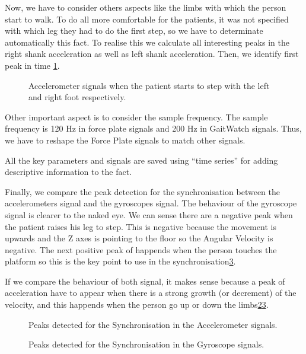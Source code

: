 Now, we have to consider others aspects like the limbs with which the person start to walk. To do all more comfortable for the patients, it was not specified with which leg they had to do the first step, so we have to determinate automatically this fact. To realise this we calculate all interesting peaks in the right shank acceleration as well as left shank acceleration. Then, we identify first peak in time \ref{fig:startLeftRight}.

\begin{figure}[H]
	\centering
	\caption{Accelerometer signals when the patient starts to step with the left and right foot respectively.}
	\label{fig:startLeftRight}
\end{figure} 

Other important aspect is to consider the sample frequency. The sample frequency is 120 Hz in force plate signals and 200 Hz in GaitWatch signals. Thus, we have to reshape the Force Plate signals to match other signals.

All the key parameters and signals are saved using “time series”  for adding descriptive information to the fact.

Finally, we compare the peak detection for the synchronisation between the accelerometers signal and the gyroscopes signal. The behaviour of the gyroscope signal is clearer to the naked eye. We can sense there are a negative peak when the patient raises his leg to step. This is negative because the movement is upwards and the Z axes is pointing to the floor so the Angular Velocity is negative. The next positive peak of happends when the person touches the platform so this is the key point to use in the synchronisation\ref{fig:pointdetectionGyro}.

If we compare the behaviour of both signal, it makes sense because a peak of acceleration have to appear when there is a strong growth (or decrement) of the velocity, and this happends when the person go up or down the limbs\ref{fig:pointdetectionAcc}\ref{fig:pointdetectionGyro}.


\begin{figure}[H]
	\centering
	\caption{Peaks detected for the Synchronisation in the Accelerometer signals.}
	\label{fig:pointdetectionAcc}
\end{figure}

\begin{figure}[H]
	\centering
	\caption{Peaks detected for the Synchronisation in the Gyroscope signals.}
	\label{fig:pointdetectionGyro}
\end{figure}

